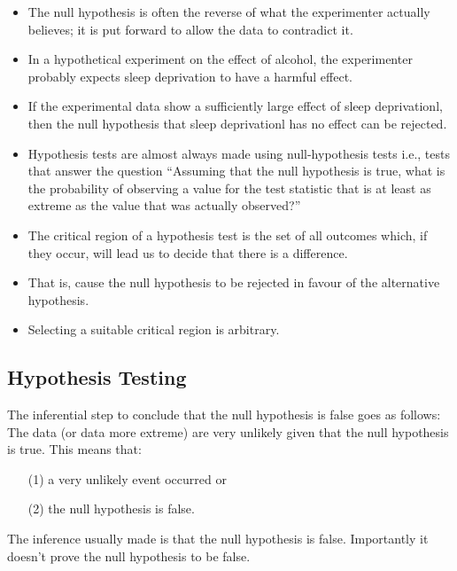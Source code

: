 \documentclass[]{report}
\begin{document}
{{{\begin{itemize}
	\item 
The null hypothesis is often the reverse of what the experimenter actually believes; it is put forward to allow the data to contradict it. \item In a hypothetical experiment on the effect of alcohol, the experimenter probably expects sleep deprivation to have a harmful effect. \item If the experimental data show a sufficiently large effect of sleep deprivationl, then the null hypothesis that sleep deprivationl has no effect can be rejected. 
\end{itemize}

\begin{itemize}
\item Hypothesis tests are almost always made using null-hypothesis tests i.e., tests that answer the question “Assuming that the null hypothesis is true, what is the probability of observing a value for the test statistic that is at least as extreme as the value that was actually observed?” 
\item
The critical region of a hypothesis test is the set of all outcomes which, if they occur, will lead us to decide that there is a difference. 
\item That is, cause the null hypothesis to be rejected in favour of the alternative hypothesis. 
\item Selecting a suitable critical region is arbitrary.
\end{itemize}



\subsection{Hypothesis Testing}
The inferential step to conclude that the null hypothesis is false goes as follows: The data (or data more extreme) are very unlikely given that the null hypothesis is true.
\bigskip
This means that:
\begin{itemize}
\item[(1)] a very unlikely event occurred or
\item[(2)] the null hypothesis is false.
\end{itemize}
\bigskip
The inference usually made is that the null hypothesis is false. Importantly it doesn't prove the null hypothesis to be false.




}}}
\end{document}
